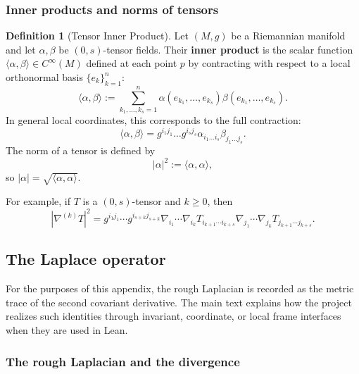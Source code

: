 \documentclass[11pt]{article}
\theoremstyle{plain}
\theoremstyle{definition}
\newtheorem{definition}[theorem]{Definition}
\theoremstyle{remark}
\begin{document}
\subsubsection{Inner products and norms of tensors}

\begin{definition}[Tensor Inner Product]
\label{def:tensor_inner_product}
    Let $(M, g)$ be a Riemannian manifold and let $\alpha, \beta$ be $(0,s)$-tensor fields.
    Their \textbf{inner product} is the scalar function $\langle \alpha, \beta \rangle \in C^\infty(M)$ defined at each point $p$ by contracting with respect to a local orthonormal basis $\{e_k\}_{k=1}^n$:
    \begin{equation}
        \langle \alpha , \beta \rangle := \sum_{k_1, \dots, k_s=1}^{n} \alpha (e_{k_1}, \dots, e_{k_s}) \beta (e_{k_1}, \dots, e_{k_s}).
    \end{equation}
    In general local coordinates, this corresponds to the full contraction:
    \begin{equation}
        \langle \alpha , \beta \rangle = g^{i_1 j_1} \dots g^{i_s j_s} \alpha_{i_1 \dots i_s} \beta_{j_1 \dots j_s}.
    \end{equation}
    The norm of a tensor is defined by 
\begin{equation}
    |\alpha|^2 := \langle \alpha, \alpha \rangle ,
\end{equation}
so $|\alpha| = \sqrt{\langle \alpha, \alpha \rangle}$.
\end{definition}

For example, if $T$ is a $(0,s)$-tensor and $k\geq 0$, then 
\begin{equation}
    |\nabla^{(k)}T|^2 = g^{i_1 j_1} \cdots g^{i_{s+k} j_{s+k}} \nabla_{i_1}\cdots \nabla_{i_k}T_{i_{k+1} \cdots i_{k+s}} \nabla_{j_1} \cdots \nabla_{j_k}T_{j_{k+1} \cdots j_{k+s}} .  
\end{equation}

\subsection{The Laplace operator}

For the purposes of this appendix, the rough Laplacian is recorded as the
metric trace of the second covariant derivative.  The main text explains how
the project realizes such identities through invariant, coordinate, or local
frame interfaces when they are used in Lean.

\subsubsection{The rough Laplacian and the divergence}
\end{document}

